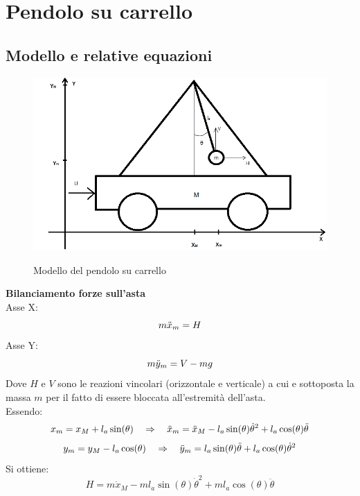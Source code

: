 \chapter{Pendolo su carrello}\label{PendCarrello}
\section{Modello e relative equazioni}

\begin{figure}[ht]
	\centering
	\includegraphics[width=\textwidth]{pendolo.png}\\
	\caption{Modello del pendolo su carrello}
	\label{pendolo}
\end{figure}
\textbf{Bilanciamento forze sull'asta}\\
Asse X:
\begin{equation}\notag
m\ddot{x}_m=H
\end{equation}
Asse Y:
\begin{equation}\notag
m\ddot{y}_m=V-mg
\end{equation}
Dove $H$ e $V$ sono le reazioni vincolari (orizzontale e verticale) a cui e sottoposta la massa $m$ per il fatto di essere bloccata all'estremità dell'asta.\\ 
Essendo:\\
\begin{equation}\notag
x_m = x_M+l_a\sin(\theta) \quad \Rightarrow \quad \ddot{x}_m=\ddot{x}_M-l_a\sin(\theta)\dot{\theta}^2+l_a\cos(\theta)\ddot{\theta}
\end{equation}
\begin{equation}\notag
y_m=y_M-l_a\cos(\theta) \quad \Rightarrow \quad \ddot{y}_m=l_a\sin(\theta)\ddot{\theta}+l_a\cos(\theta)\dot{\theta}^2
\end{equation}
Si ottiene:
\begin{equation}\label{Hv}
H=m\ddot{x}_M-ml_a\sin(\theta)\dot{\theta}^2+ml_a\cos(\theta)\ddot{\theta}
\end{equation}
